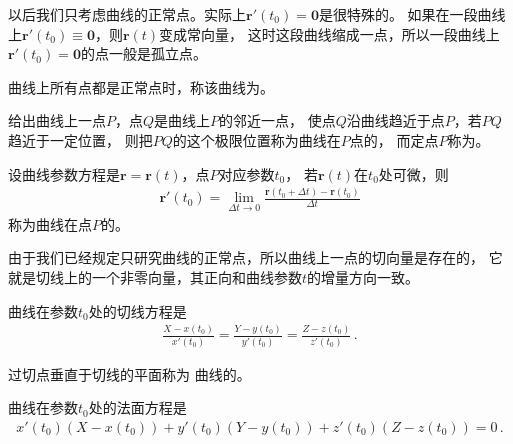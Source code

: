 以后我们只考虑曲线的正常点。实际上$\bm r'(t_0)=\bm 0$是很特殊的。
如果在一段曲线上$\bm r'(t_0)\equiv\bm 0$，则$\bm r(t)$变成常向量，
这时这段曲线缩成一点，所以一段曲线上$\bm r'(t_0)=\bm 0$的点一般是孤立点。
\begin{definition}
    曲线上所有点都是正常点时，称该曲线为。
\end{definition}

\begin{definition}
    给出曲线上一点$P$，点$Q$是曲线上$P$的邻近一点，
    使点$Q$沿曲线趋近于点$P$，若$PQ$趋近于一定位置，
    则把$PQ$的这个极限位置称为曲线在$P$点的，
    而定点$P$称为。
\end{definition}

\begin{definition}
    设曲线参数方程是$\bm r=\bm r(t)$，点$P$对应参数$t_0$，
    若$\bm r(t)$在$t_0$处可微，则
    \begin{align}\label{eq:03ex01.5}
        \bm r'(t_0)=\lim\limits_{\Delta t\rightarrow0}{\frac{\bm r(t_0+\Delta t)-\bm r(t_0)}{\Delta t}}
    \end{align}
    称为曲线在点$P$的。
\end{definition}

由于我们已经规定只研究曲线的正常点，所以曲线上一点的切向量是存在的，
它就是切线上的一个非零向量，其正向和曲线参数$t$的增量方向一致。

\begin{corollary}
    曲线在参数$t_0$处的切线方程是
    \begin{align}\label{eq:03ex01.6}
        \frac{X-x(t_0)}{x'(t_0)}=\frac{Y-y(t_0)}{y'(t_0)}=\frac{Z-z(t_0)}{z'(t_0)}\, .
    \end{align}
\end{corollary}

\begin{definition}
    过切点垂直于切线的平面称为
    曲线的。
\end{definition}

\begin{corollary}
    曲线在参数$t_0$处的法面方程是
    \begin{align}\label{eq:03ex01.7}
        x'(t_0)(X-x(t_0))+y'(t_0)(Y-y(t_0))+z'(t_0)(Z-z(t_0))=0\, .
    \end{align}
\end{corollary}

